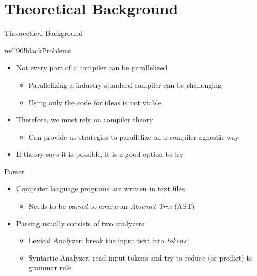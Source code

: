 \section{Theoretical Background}
\begin{frame}{Theorectical Background}
  \begin{coloredblock}{red!90!black}{Problems}
    \begin{itemize}
      \item Not every part of a compiler can be parallelized
      \begin{itemize}
        \item Parallelizing a industry standard compiler can be challenging
        \item Using only the code for ideas is not viable
      \end{itemize}
      \item Therefore, we must rely on compiler theory
      \begin{itemize}
          \item Can provide us strategies to parallelize on a compiler agnostic way
      \end{itemize}
      \item If theory says it is possible, it is a good option to try
    \end{itemize}
  \end{coloredblock}
\end{frame}
\begin{frame}{Parser}
    \begin{itemize}
        \item Computer language programs are written in text files
        \begin{itemize}
            \item Needs to be \textit{parsed} to create an \textit{Abstract Tree} (AST) 
        \end{itemize}
        \item Parsing usually consists of two analyzers:
        \begin{itemize}
            \item Lexical Analyzer: break the input text into \textit{tokens}
            \item Syntactic Analyzer: read input tokens and try to reduce (or predict)
            to grammar rule
        \end{itemize}
    \end{itemize}
\end{frame}
